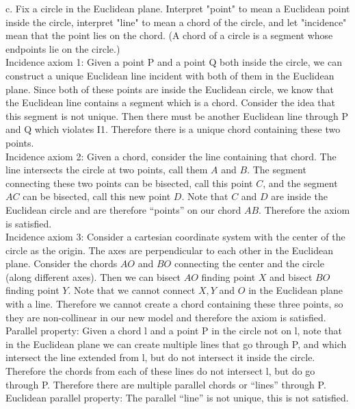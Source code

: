 \documentclass[12pt,letterpaper]{article}
\begin{document}
c. Fix a circle in the Euclidean plane.  Interpret "point" to mean a Euclidean point inside the circle, interpret "line" to mean a chord of the circle, and let "incidence" mean that the point lies on the chord.  (A chord of a circle is a segment whose endpoints lie on the circle.)\\


Incidence axiom 1: Given a point P and a point Q both inside the circle, we can construct a unique Euclidean line incident with both of them in the Euclidean plane. Since both of these points are inside the Euclidean circle, we know that the Euclidean line contains a segment which is a chord.   Consider the idea that this segment is not unique.  Then there must be another Euclidean line through P and Q which violates I1.  Therefore there is a unique chord containing these two points.  \\


Incidence axiom 2: Given a chord, consider the line containing that chord.  The line intersects the circle at two points, call them $A$ and $B$.  The segment connecting these two points can be bisected, call this point $C$, and the segment $AC$ can be bisected, call this new point $D$.  Note that $C$ and $D$ are inside the Euclidean circle and are therefore ``points'' on our chord $AB$.  Therefore the axiom is satisfied. \\


Incidence axiom 3: Consider a cartesian coordinate system with the center of the circle as the origin.  The axes are perpendicular to each other in the Euclidean plane. Consider the chords $AO$ and $BO$ connecting the center and the circle (along different axes). Then we can bisect $AO$ finding point $X$ and bisect $BO$ finding point $Y$.  Note that we cannot connect $X,Y$ and $O$ in the Euclidean plane with a line.  Therefore we cannot create a chord containing these three points, so they are non-collinear in our new model and therefore the axiom is satisfied. \\

Parallel property: Given a chord l and a point P in the circle not on l, note that in the Euclidean plane we can create multiple lines that go through P, and which intersect the line extended from l, but do not intersect it inside the circle.  Therefore the chords from each of these lines do not intersect l, but do go through P. Therefore there are multiple parallel chords or ``lines'' through P.\\

Euclidean parallel property: The parallel ``line'' is not unique, this is not satisfied.\\
\end{document}
